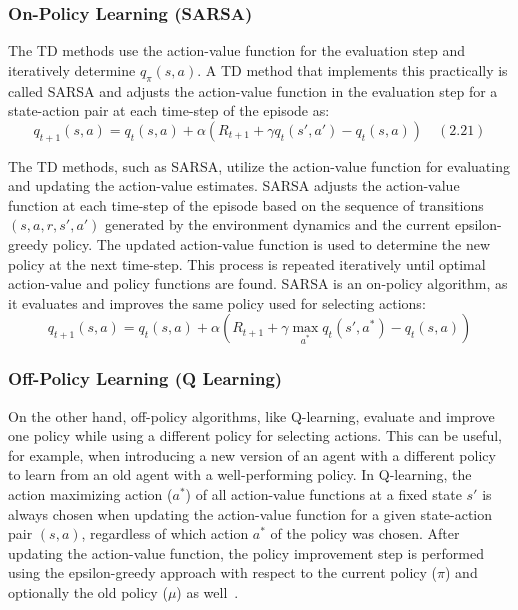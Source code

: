 \documentclass[../xlapes02]{subfiles}
\begin{document}
    \subsubsection{On-Policy Learning (SARSA)}\label{sec:td-sarsa}
    The TD methods use the action-value function for the evaluation step and iteratively determine $q_\pi(s,a)$. A TD method that implements this practically is called SARSA and adjusts the action-value function in the evaluation step for a state-action pair at each time-step of the episode as:
    \[
        q_{t+1}(s, a) = q_t(s, a) + \alpha \left( R_{t+1} + \gamma q_t(s', a') - q_t(s, a) \right) \quad (2.21)
    \]

    The TD methods, such as SARSA, utilize the action-value function for evaluating and updating the action-value estimates. SARSA adjusts the action-value function at each time-step of the episode based on the sequence of transitions \( (s, a, r, s', a') \) generated by the environment dynamics and the current epsilon-greedy policy. The updated action-value function is used to determine the new policy at the next time-step. This process is repeated iteratively until optimal action-value and policy functions are found. SARSA is an on-policy algorithm, as it evaluates and improves the same policy used for selecting actions:
    \[
        q_{t+1}(s, a) = q_t(s, a) + \alpha \left( R_{t+1} + \gamma \max_{a^*} q_t(s', a^*) - q_t(s, a) \right)
    \]

    \subsubsection{Off-Policy Learning (Q Learning)}\label{sec:td-q-learning}
    On the other hand, off-policy algorithms, like Q-learning, evaluate and improve one policy while using a different policy for selecting actions. This can be useful, for example, when introducing a new version of an agent with a different policy to learn from an old agent with a well-performing policy. In Q-learning, the action maximizing action (\( a^* \)) of all action-value functions at a fixed state \( s' \) is always chosen when updating the action-value function for a given state-action pair \( (s, a) \), regardless of which action \( a^* \) of the policy was chosen. After updating the action-value function, the policy improvement step is performed using the epsilon-greedy approach with respect to the current policy (\( \pi \)) and optionally the old policy (\( \mu \)) as well~\cite{FITMT25127, sutton2018reinforcement}.
\end{document}
